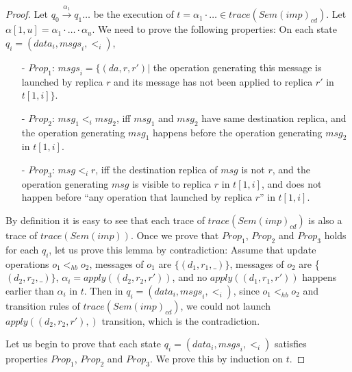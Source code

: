 \begin {proof}

Let $q_0 {\xrightarrow{\alpha_1}} q_1 \ldots$ be the execution of $t = \alpha_1 \cdot \ldots \in \mathit{trace}( \mathit{Sem}(\mathit{imp})_{\mathit{cd}} )$. Let $\alpha[1,u] = \alpha_1 \cdot \ldots \cdot \alpha_u$. We need to prove the following properties: On each state $q_i=(\mathit{data}_i,\mathit{msgs}_i,<_i)$,

\begin{itemize}
\setlength{\itemsep}{0.5pt}
\item[-] $\mathit{Prop}_1$: $\mathit{msgs}_i = \{ (\mathit{da},r,r') \vert$ the operation generating this message is launched by replica $r$ and its message has not been applied to replica $r'$ in $t[1,i]\}$.

\item[-] $\mathit{Prop}_2$: $\mathit{msg}_1 <_i \mathit{msg}_2$, iff $\mathit{msg}_1$ and $\mathit{msg}_2$ have same destination replica, and the operation generating $\mathit{msg}_1$ happens before the operation generating $\mathit{msg}_2$ in $t[1,i]$.

\item[-] $\mathit{Prop}_3$: $\mathit{msg} <_i r$, iff the destination replica of $\mathit{msg}$ is not $r$, and the operation generating $\mathit{msg}$ is visible to replica $r$ in $t[1,i]$, and does not happen before ``any operation that launched by replica $r$'' in $t[1,i]$.
\end{itemize}

By definition it is easy to see that each trace of $\mathit{trace}( \mathit{Sem}(\mathit{imp})_{\mathit{cd}} )$ is also a trace of $\mathit{trace}( \mathit{Sem}(\mathit{imp}) )$. Once we prove that $\mathit{Prop}_1$, $\mathit{Prop}_2$ and $\mathit{Prop}_3$ holds for each $q_i$, let us prove this lemma by contradiction: Assume that update operations $o_1 <_{hb} o_2$, messages of $o_1$ are $\{ (d_1,r_1,\_) \}$, messages of $o_2$ are \{ $(d_2,r_2,\_) \}$, $\alpha_i = apply((d_2,r_2,r'))$, and no $apply((d_1,r_1,r'))$ happens earlier than $\alpha_i$ in $t$. Then in $q_i=(\mathit{data}_i,\mathit{msgs}_i,<_i)$, since $o_1 <_{hb} o_2$ and transition rules of $\mathit{trace}( \mathit{Sem}(\mathit{imp})_{\mathit{cd}} )$, we could not launch $apply((d_2,r_2,r'),)$ transition, which is the contradiction.


Let us begin to prove that each state $q_i=(\mathit{data}_i,\mathit{msgs}_i,<_i)$ satisfies properties $\mathit{Prop}_1$, $\mathit{Prop}_2$ and $\mathit{Prop}_3$. We prove this by induction on $t$.


\end{proof}
